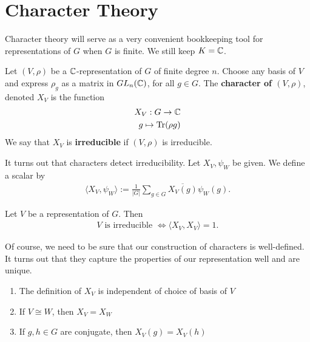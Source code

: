 \documentclass{memoir}
\begin{document}



\section{Character Theory}
\label{sec:character_theory}

Character theory will serve as a very convenient bookkeeping tool for representations of \(G\) when \(G\) is finite. We still keep \(K = \mathbb{C}\).

\begin{defn}
	Let \((V,\rho)\) be a \(\mathbb{C}\)-representation of \(G\) of finite degree \(n\). Choose any basis of \(V\) and express \(\rho_g\) as a matrix in \(GL_n(\mathbb{C})\), for all \(g \in G\). The \textbf{character of \((V,\rho)\)}, denoted \(X_V\) is the function
	\begin{align*}
		X_V:G\to \mathbb{C}\\
		g\mapsto \textrm{Tr}(\rho g)
	\end{align*}
	We say that \(X_V\) is \textbf{irreducible} if \((V,\rho)\) is irreducible.
\end{defn}
It turns out that characters detect irreducibility. Let \(X_V,\psi_W\) be given. We define a scalar by
\begin{align*}
	\langle X_V,\psi_W \rangle := \frac{1}{\left| G \right| }\sum_{g \in G} \overline{X_V(g)}\psi_W(g).
\end{align*}
\begin{prop}
	Let \(V\) be a representation of \(G\). Then
	\begin{align*}
		V \text{ is irreducible }\iff\langle X_V,X_V \rangle =1.
	\end{align*}
\end{prop}

Of course, we need to be sure that our construction of characters is well-defined. It turns out that they capture the properties of our representation well and are unique.

\begin{prop}
	\begin{enumerate}
		\item The definition of \(X_V\) is independent of choice of basis of \(V\)
		\item If \(V \cong W\), then \(X_V = X_W\) 
		\item If \(g,h \in G\) are conjugate, then \(X_V(g) = X_V(h)\)
	\end{enumerate}
\end{prop}
\end{document}
